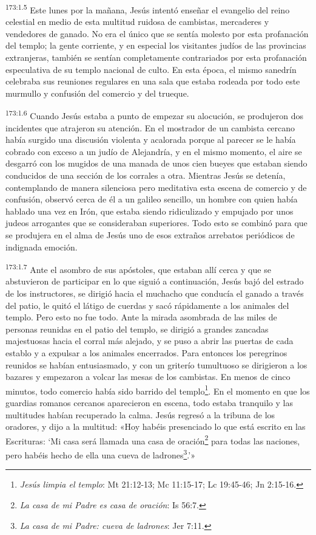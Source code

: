 \par
\textsuperscript{173:1.5} Este lunes por la mañana, Jesús intentó enseñar el evangelio del reino celestial en medio de esta multitud ruidosa de cambistas, mercaderes y vendedores de ganado. No era el único que se sentía molesto por esta profanación del templo; la gente corriente, y en especial los visitantes judíos de las provincias extranjeras, también se sentían completamente contrariados por esta profanación especulativa de su templo nacional de culto. En esta época, el mismo sanedrín celebraba sus reuniones regulares en una sala que estaba rodeada por todo este murmullo y confusión del comercio y del trueque.

\par
\textsuperscript{173:1.6} Cuando Jesús estaba a punto de empezar su alocución, se produjeron dos incidentes que atrajeron su atención. En el mostrador de un cambista cercano había surgido una discusión violenta y acalorada porque al parecer se le había cobrado con exceso a un judío de Alejandría, y en el mismo momento, el aire se desgarró con los mugidos de una manada de unos cien bueyes que estaban siendo conducidos de una sección de los corrales a otra. Mientras Jesús se detenía, contemplando de manera silenciosa pero meditativa esta escena de comercio y de confusión, observó cerca de él a un galileo sencillo, un hombre con quien había hablado una vez en Irón, que estaba siendo ridiculizado y empujado por unos judeos arrogantes que se consideraban superiores. Todo esto se combinó para que se produjera en el alma de Jesús uno de esos extraños arrebatos periódicos de indignada emoción.

\par
\textsuperscript{173:1.7} Ante el asombro de sus apóstoles, que estaban allí cerca y que se abstuvieron de participar en lo que siguió a continuación, Jesús bajó del estrado de los instructores, se dirigió hacia el muchacho que conducía el ganado a través del patio, le quitó el látigo de cuerdas y sacó rápidamente a los animales del templo. Pero esto no fue todo. Ante la mirada asombrada de las miles de personas reunidas en el patio del templo, se dirigió a grandes zancadas majestuosas hacia el corral más alejado, y se puso a abrir las puertas de cada establo y a expulsar a los animales encerrados. Para entonces los peregrinos reunidos se habían entusiasmado, y con un griterío tumultuoso se dirigieron a los bazares y empezaron a volcar las mesas de los cambistas. En menos de cinco minutos, todo comercio había sido barrido del templo\footnote{\textit{Jesús limpia el templo}: Mt 21:12-13; Mc 11:15-17; Lc 19:45-46; Jn 2:15-16.}. En el momento en que los guardias romanos cercanos aparecieron en escena, todo estaba tranquilo y las multitudes habían recuperado la calma. Jesús regresó a la tribuna de los oradores, y dijo a la multitud: «Hoy habéis presenciado lo que está escrito en las Escrituras: `Mi casa será llamada una casa de oración\footnote{\textit{La casa de mi Padre es casa de oración}: Is 56:7.} para todas las naciones, pero habéis hecho de ella una cueva de ladrones\footnote{\textit{La casa de mi Padre: cueva de ladrones}: Jer 7:11.}.'»


